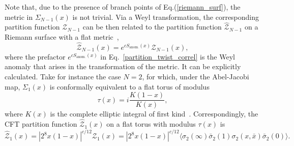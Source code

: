 \documentclass[a4paper,11pt]{article}
\begin{document}

Note that, due to the presence of branch points of Eq.(\ref{riemann_surf}), the metric in $\Sigma_{N-1}(x)$ is not trivial.  Via a Weyl transformation, the corresponding partition function $\mathcal{Z}_{N-1}$ can be then related to the partition function $\mathcal{\hat{Z}}_{N-1}$ on a Riemann surface with a flat metric~\cite{Lunin},  
\begin{equation}\label{partition_twist_correl}
 \mathcal{\hat{Z}}_{N-1}(x)=e^{cS_{\text{anom.}}(x)} \mathcal{Z}_{N-1}(x),
\end{equation}
where the prefactor $e^{cS_{\text{anom.}}(x)}$ in Eq.~\eqref{partition_twist_correl} is the Weyl anomaly that arises in the 
transformation of the metric.
It can be explicitly calculated. Take for instance the case $N=2$, for which, under the Abel-Jacobi map, $\Sigma_{1}(x)$ is conformally equivalent to a flat torus of modulus 
\begin{equation}\label{tau}
 \tau(x)=i\frac{K(1-x)}{K(x)}, 
\end{equation}
where $K(x)$ is the complete elliptic integral of first 
kind~\cite{Whittaker}. Correspondingly, the CFT partition function $\mathcal{\hat{Z}}_1(x)$ on a flat torus 
with modulus $\tau(x)$ is~\cite{Lunin}
\begin{equation}\label{partition_torus_twist}
 \mathcal{\hat{Z}}_1(x)=|2^8 x(1-x)|^{c/12} \mathcal{Z}_{1}(x)
 =|2^8 x(1-x)|^{c/12} \langle \sigma_2 (\infty)\bar{\sigma}_2(1)\sigma_2(x, \bar{x})\bar{\sigma}_2(0)\rangle.
\end{equation}
\end{document}
